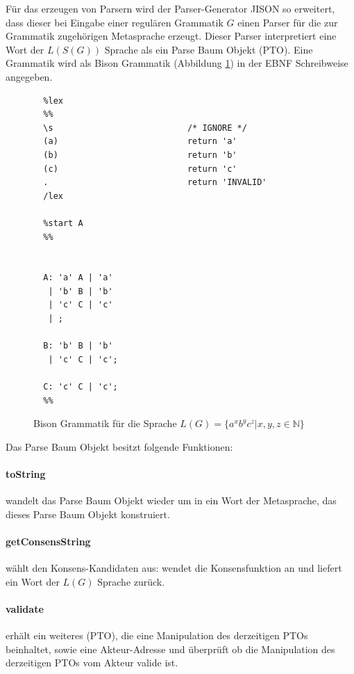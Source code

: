 \documentclass[a4paper,12pt]{report}
\begin{document}
Für das erzeugen von Parsern wird der Parser-Generator JISON so erweitert, dass dieser bei Eingabe einer regulären Grammatik $G$ einen Parser für die zur Grammatik zugehörigen Metasprache erzeugt. Dieser Parser interpretiert eine Wort der $L(S(G))$ Sprache als ein Parse Baum Objekt (PTO). Eine Grammatik wird als Bison Grammatik (Abbildung \ref{bisongrammar}) in der EBNF Schreibweise angegeben.

\begin{figure}[ht]
  \centering
  \begin{lstlisting}
  %lex
  %%
  \s                           /* IGNORE */
  (a)                          return 'a'
  (b)                          return 'b'
  (c)                          return 'c'
  .                            return 'INVALID'
  /lex

  %start A
  %% 


  A: 'a' A | 'a'
   | 'b' B | 'b'
   | 'c' C | 'c'
   | ;

  B: 'b' B | 'b'
   | 'c' C | 'c';

  C: 'c' C | 'c';
  %%
  \end{lstlisting}
  \caption{ Bison Grammatik für die Sprache $L(G) = \{ a^xb^yc^z | x,y,z\in \mathbb{N} \}$ }
  \label{bisongrammar}
\end{figure}

Das Parse Baum Objekt besitzt folgende Funktionen:

\paragraph*{toString}
wandelt das Parse Baum Objekt wieder um in ein Wort der Metasprache, das dieses Parse Baum Objekt konstruiert.

\paragraph*{getConsensString}
wählt den Konsens-Kandidaten aus:
wendet die Konsensfunktion an und liefert ein Wort der $L(G)$ Sprache zurück.

\paragraph*{validate}
erhält ein weiteres (PTO), die eine Manipulation des derzeitigen PTOs beinhaltet, sowie eine Akteur-Adresse und überprüft ob die Manipulation des derzeitigen PTOs vom Akteur valide ist.
\end{document}

